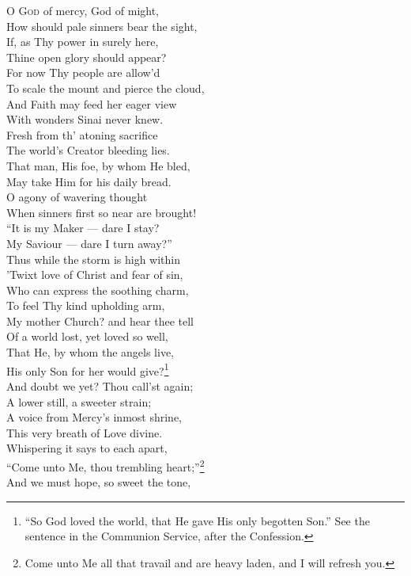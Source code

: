 \textsc{O God} of mercy, God of might, \\
 How should pale sinners bear the sight, \\
 If, as Thy power in surely here, \\
 Thine open glory should appear? \\
  For now Thy people are allow’d \\
 To scale the mount and pierce the cloud, \\
 And Faith may feed her eager view \\
 With wonders Sinai never knew. \\
  Fresh from th’ atoning sacrifice \\
 The world’s Creator bleeding lies. \\
 That man, His foe, by whom He bled, \\
 May take Him for his daily bread. \\
  O agony of wavering thought \\
 When sinners first so near are brought! \\
 “It is my Maker — dare I stay? \\
 My Saviour — dare I turn away?” \\
  Thus while the storm is high within \\
 ’Twixt love of Christ and fear of sin, \\
 Who can express the soothing charm, \\
 To feel Thy kind upholding arm, \\
  My mother Church? and hear thee tell \\
 Of a world lost, yet loved so well, \\
 That He, by whom the angels live, \\
 His only Son for her would give?\footnote{“So God loved the world, that He gave His only begotten Son.” See the sentence in the Communion Service, after the Confession.} \\
  And doubt we yet? Thou call’st again; \\
 A lower still, a sweeter strain; \\
 A voice from Mercy’s inmost shrine, \\
 This very breath of Love divine. \\
  Whispering it says to each apart, \\
 “Come unto Me, thou trembling heart;”\footnote{Come unto Me all that travail and are heavy laden, and I will refresh you.} \\
 And we must hope, so sweet the tone, \\
